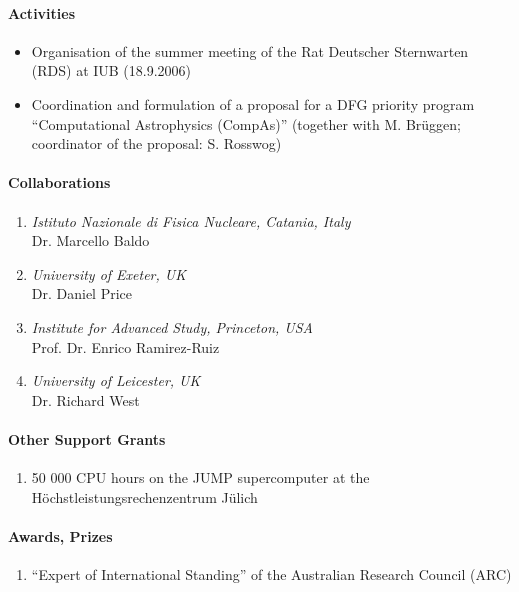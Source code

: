 \paragraph{Activities}
\begin{itemize}
\item Organisation of the summer meeting of the Rat Deutscher Sternwarten
  (RDS) at IUB (18.9.2006)
\item Coordination and formulation of a proposal for a DFG priority program
      ``Computational Astrophysics (CompAs)'' (together with M. Br\"uggen;
      coordinator of the proposal: S. Rosswog)
\end{itemize}

\paragraph{Collaborations}
\begin{enumerate}
\item {\sl Istituto Nazionale di Fisica Nucleare, Catania, Italy}\\
Dr. Marcello Baldo
\item {\sl University of Exeter, UK} \\
Dr. Daniel Price
\item {\sl Institute for Advanced Study, Princeton, USA} \\
Prof. Dr. Enrico  Ramirez-Ruiz
\item {\sl University of Leicester, UK} \\
Dr. Richard West
\end{enumerate}

\paragraph{Other Support Grants }
\begin{enumerate}
\item 50 000 CPU hours on the JUMP supercomputer at the H\"ochstleistungsrechenzentrum J\"ulich
\end{enumerate}


\paragraph{Awards, Prizes}
\begin{enumerate}
\item ``Expert of International Standing'' of the Australian Research Council (ARC)
\end{enumerate}

\nocite{Rosswog1} \nocite{Rosswog2} \nocite{Rosswog3}
\nocite{Rosswog4} \nocite{rosswog5}
%
